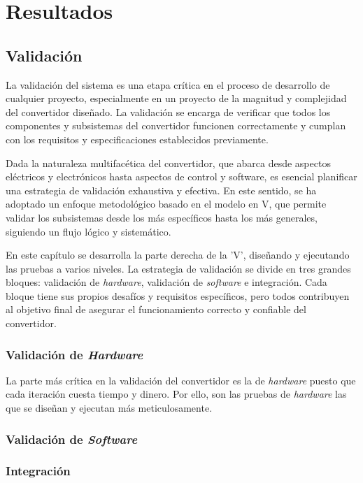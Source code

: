 \chapter{Resultados}

\section{Validación}
La validación del sistema es una etapa crítica en el proceso de desarrollo de cualquier proyecto, especialmente en un proyecto de la magnitud y complejidad del convertidor diseñado. La validación se encarga de verificar que todos los componentes y subsistemas del convertidor funcionen correctamente y cumplan con los requisitos y especificaciones establecidos previamente.

Dada la naturaleza multifacética del convertidor, que abarca desde aspectos eléctricos y electrónicos hasta aspectos de control y software, es esencial planificar una estrategia de validación exhaustiva y efectiva. En este sentido, se ha adoptado un enfoque metodológico basado en el modelo en V, que permite validar los subsistemas desde los más específicos hasta los más generales, siguiendo un flujo lógico y sistemático. 

En este capítulo se desarrolla la parte derecha de la 'V', diseñando y ejecutando las pruebas a varios niveles. La estrategia de validación se divide en tres grandes bloques: validación de \textit{hardware}, validación de \textit{software} e integración. Cada bloque tiene sus propios desafíos y requisitos específicos, pero todos contribuyen al objetivo final de asegurar el funcionamiento correcto y confiable del convertidor.

\subsection{Validación de \textit{Hardware}}
La parte más crítica en la validación del convertidor es la de \textit{hardware} puesto que cada iteración cuesta tiempo y dinero. Por ello, son las pruebas de \textit{hardware} las que se diseñan y ejecutan más meticulosamente.

\subsection{Validación de \textit{Software}}

\subsection{Integración}
